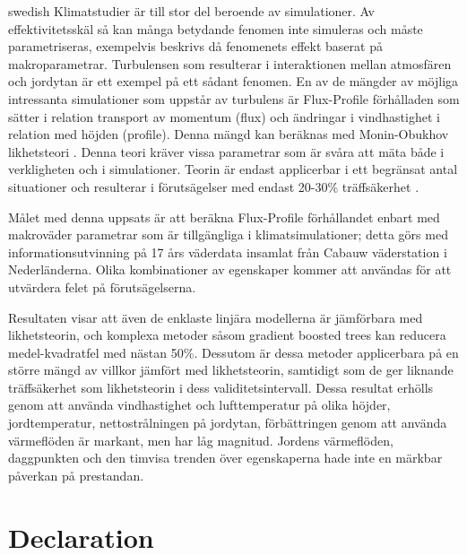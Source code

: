 \documentclass[a4paper,11pt]{kth-mag}
\begin{document}
\begin{foreignabstract}{swedish}
Klimatstudier är till stor del beroende av simulationer. Av effektivitetsskäl så kan många betydande fenomen inte simuleras och måste parametriseras, exempelvis beskrivs då fenomenets effekt baserat på makroparametrar. Turbulensen som resulterar i interaktionen mellan atmosfären och jordytan är ett exempel på ett sådant fenomen. En av de mängder av möjliga intressanta simulationer som uppstår av turbulens är Flux-Profile förhålladen som sätter i relation transport av momentum (flux) och ändringar i vindhastighet i relation med höjden (profile). Denna mängd kan beräknas med Monin-Obukhov likhetsteori  \citep{mostayyyy}. Denna teori kräver vissa parametrar som är svåra att mäta både i verkligheten och i simulationer. Teorin är endast applicerbar i ett begränsat antal situationer och resulterar i förutsägelser med endast 20-30\% träffsäkerhet \citep{50years}.

Målet med denna uppsats är att beräkna Flux-Profile förhållandet enbart med makroväder parametrar som är tillgängliga i klimatsimulationer; detta görs med informationsutvinning på 17 års väderdata insamlat från Cabauw väderstation i Nederländerna. Olika kombinationer av egenskaper kommer att användas för att utvärdera felet på förutsägelserna.

Resultaten visar att även de enklaste linjära modellerna är jämförbara med likhetsteorin, och komplexa metoder såsom gradient boosted trees kan reducera medel-kvadratfel med nästan 50\%. Dessutom är dessa metoder applicerbara på en större mängd av villkor jämfört med likhetsteorin, samtidigt som de ger liknande träffsäkerhet som likhetsteorin i dess validitetsintervall. Dessa resultat erhölls genom att använda vindhastighet och lufttemperatur på olika höjder, jordtemperatur, nettostrålningen på jordytan, förbättringen genom att använda värmeflöden är markant, men har låg magnitud. Jordens värmeflöden, daggpunkten och den timvisa trenden över egenskaperna hade inte en märkbar påverkan på prestandan.
\end{foreignabstract}
\clearpage

\clearpage
\pagestyle{empty}

\chapter*{Declaration}

\vspace*{2cm}
\noindent
\end{document}
